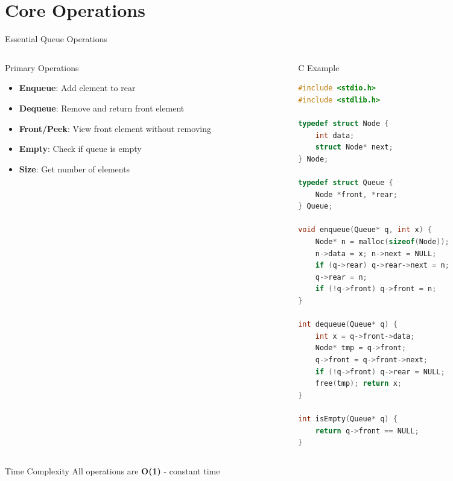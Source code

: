 \documentclass[aspectratio=169,xcolor=dvipsnames]{beamer}
\begin{document}
\section{Core Operations}

\begin{frame}[fragile]{Essential Queue Operations}
  \begin{columns}
    \begin{column}{0.5\textwidth}
      \begin{block}{Primary Operations}
        \begin{itemize}
          \item \textbf{Enqueue}: Add element to rear
          \item \textbf{Dequeue}: Remove and return front element
          \item \textbf{Front/Peek}: View front element without removing
          \item \textbf{Empty}: Check if queue is empty
          \item \textbf{Size}: Get number of elements
        \end{itemize}
      \end{block}
    \end{column}
    \begin{column}{0.45\textwidth}
      \begin{exampleblock}{C Example}
        \begin{lstlisting}[language=C,basicstyle=\tiny\ttfamily]
#include <stdio.h>
#include <stdlib.h>

typedef struct Node {
    int data;
    struct Node* next;
} Node;

typedef struct Queue {
    Node *front, *rear;
} Queue;

void enqueue(Queue* q, int x) {
    Node* n = malloc(sizeof(Node));
    n->data = x; n->next = NULL;
    if (q->rear) q->rear->next = n;
    q->rear = n;
    if (!q->front) q->front = n;
}

int dequeue(Queue* q) {
    int x = q->front->data;
    Node* tmp = q->front;
    q->front = q->front->next;
    if (!q->front) q->rear = NULL;
    free(tmp); return x;
}

int isEmpty(Queue* q) {
    return q->front == NULL;
}
        \end{lstlisting}
      \end{exampleblock}
    \end{column}
  \end{columns}

  \vspace{0.5cm}

  \begin{alertblock}{Time Complexity}
    All operations are \textbf{O(1)} - constant time
  \end{alertblock}
\end{frame}
\end{document}
